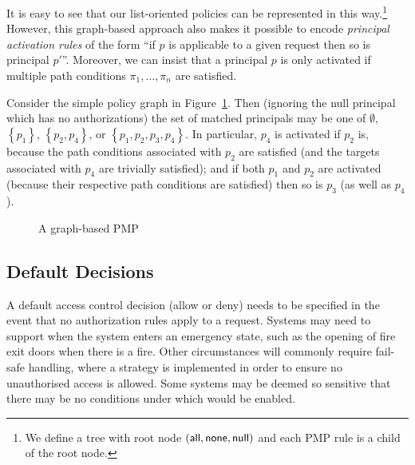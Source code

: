 \documentclass{article}
\newcommand{\set}[1]{\ensuremath{\left\{#1\right\}}} \newcommand{\setO}[1]{\ensuremath{\left\{#1\right.}} \newcommand{\setC}[1]{\ensuremath{\left.#1\right\}}} \newcommand{\setN}[1]{\ensuremath{\left.#1\right.}} \newcommand{\sett}[1]{\ensuremath{\left\{\textit{#1}\right\}}} \newcommand{\tuple}[1]{\ensuremath{\left(#1\right)}} \newcommand{\tuplet}[1]{\ensuremath{\left(\textit{#1}\right)}} \newcommand{\card}[1]{\left| #1 \right|}
\begin{document}
It is easy to see that our list-oriented policies can be represented in this way.\footnote{We define a tree with root node $(\mathsf{all},\mathsf{none},{\sf null})$ and each PMP rule is a child of the root node.}
However, this graph-based approach also makes it possible to encode \emph{principal activation rules} of the form ``if $p$ is applicable to a given request then so is principal $p'$''.
Moreover, we can insist that a principal $p$ is only activated if multiple path conditions $\pi_1,\dots,\pi_n$ are satisfied.

Consider the simple policy graph in Figure~\ref{fig:graph-based-pmp}.
Then (ignoring the {\sf null} principal which has no authorizations) the set of matched principals may be one of $\emptyset$, $\set{p_1}$, $\set{p_2,p_4}$, or $\set{p_1,p_2,p_3,p_4}$.
In particular, $p_4$ is activated if $p_2$ is, because the path conditions associated with $p_2$ are satisfied (and the targets associated with $p_4$ are trivially satisfied); and if both $p_1$ and $p_2$ are activated (because their respective path conditions are satisfied) then so is $p_3$ (as well as $p_4$).

\begin{figure}[!ht]\centering
    \caption{A graph-based PMP}\label{fig:graph-based-pmp}
\end{figure}

\subsection{Default Decisions}\label{sec:model:defaults}
A default access control decision (allow or deny) needs to be specified in the event that no authorization rules apply to a request.
Systems may need to support  when the system enters an emergency state, such as the opening of fire exit doors when there is a fire.
Other circumstances will commonly require fail-safe handling, where a  strategy is implemented in order to ensure no unauthorised access is allowed. Some systems may be deemed so sensitive that there may be no conditions under which  would be enabled.
\end{document}

